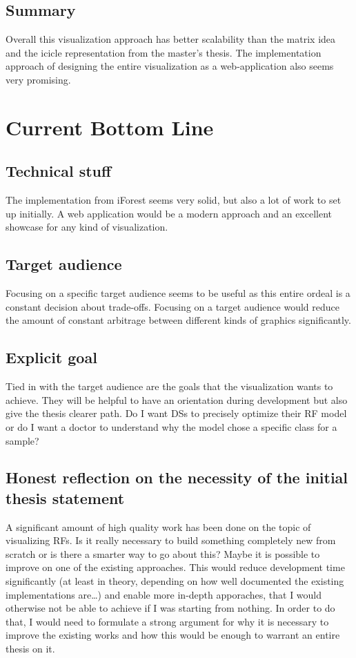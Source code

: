 \documentclass[a4paper, 12pt]{article}
\begin{document}
\subsection{Summary}
Overall this visualization approach has better scalability than the matrix idea and the icicle representation from
the master's thesis. The implementation approach of designing the entire visualization as a web-application also
seems very promising.

\section{Current Bottom Line}
\subsection{Technical stuff}
The implementation from iForest seems very solid, but also a lot of work to set up initially. A web application
would be a modern approach and an excellent showcase for any kind of visualization.

\subsection{Target audience}
Focusing on a specific target audience seems to be useful as this entire ordeal is a constant decision about
trade-offs. Focusing on a target audience would reduce the amount of constant arbitrage between different kinds of
graphics significantly.

\subsection{Explicit goal}
Tied in with the target audience are the goals that the visualization wants to achieve. They will be helpful to
have an orientation during development but also give the thesis clearer path. Do I want DSs to precisely optimize
their RF model or do I want a doctor to understand why the model chose a specific class for a sample?

\subsection{Honest reflection on the necessity of the initial thesis statement}
A significant amount of high quality work has been done on the topic of visualizing RFs. Is it really necessary to
build something completely new from scratch or is there a smarter way to go about this?
Maybe it is possible to improve on one of the existing approaches. This would reduce development time significantly
(at least in theory, depending on how well documented the existing implementations are\dots) and enable more 
in-depth apporaches, that I would otherwise not be able to achieve if I was starting from nothing.
In order to do that, I would need to formulate a strong argument for why it is necessary to improve the existing
works and how this would be enough to warrant an entire thesis on it.
\end{document}
